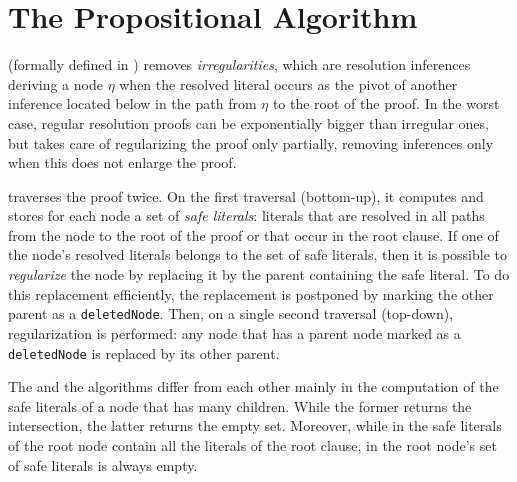 \section{The Propositional Algorithm}\label{sec:rpi}

{\RPI} (formally defined in \cite{LURPI}) removes \emph{irregularities}, which are resolution inferences deriving a node $\eta$ when the resolved literal occurs as the pivot of another inference located below in the path from $\eta$ to the root of the proof. In the worst case, regular resolution proofs can be exponentially bigger than irregular ones, but {\RPI} takes care of regularizing the proof only partially, removing inferences only when this does not enlarge the proof.

{\RPI} traverses the proof twice. On the first traversal (bottom-up), it computes and stores for each node a set of \emph{safe literals}: literals that are resolved in all paths from the node to the root of the proof or that occur in the root clause. If one of the node's resolved literals belongs to the set of safe literals, then it is possible to \emph{regularize} the node by replacing it by the parent containing the safe literal. To do this replacement efficiently, the replacement is postponed by marking the other parent as a \texttt{deletedNode}. Then, on a single second traversal (top-down), regularization is performed: any node that has a parent node marked as a \texttt{deletedNode} is replaced by its other parent.

The {\RPI} and the {\RP} algorithms differ from each other mainly in the
computation of the safe literals of a node that has many children. While the former 
returns the intersection, %
the latter returns the empty set. 
Moreover, while in {\RPI} the safe literals of the root node contain all the literals of the root clause, in {\RP} the root node's set of safe literals is always empty. %
